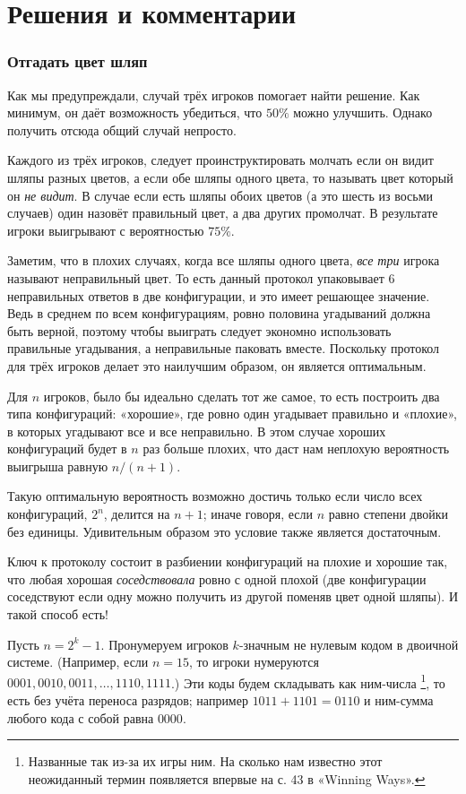 \section*{Решения и комментарии}

\subsubsection*{Отгадать цвет шляп}

Как мы предупреждали, случай трёх игроков помогает найти решение.
Как минимум, он даёт возможность убедиться, что $50\%$ можно улучшить.
Однако получить отсюда общий случай непросто.

Каждого из трёх игроков, следует проинструктировать молчать если он видит шляпы разных цветов,
а если обе шляпы одного цвета, то называть цвет который он \emph{не видит}.
В случае если есть шляпы обоих цветов (а это шесть из восьми случаев) один назовёт правильный цвет, а два других промолчат.
В результате игроки выигрывают с вероятностью $75\%$.

Заметим, что в плохих случаях, когда все шляпы одного цвета, \emph{все три} игрока называют неправильный цвет.
То есть данный протокол упаковывает 6 неправильных ответов в две конфигурации, и это имеет решающее значение.
Ведь в среднем по всем конфигурациям, ровно половина угадываний должна быть верной, поэтому чтобы выиграть следует экономно использовать правильные угадывания, а неправильные паковать вместе.
Поскольку протокол для трёх игроков делает это наилучшим образом, он является оптимальным.

Для $n$ игроков, было бы идеально сделать тот же самое,
то есть построить два типа конфигураций: «хорошие», где ровно один угадывает правильно и «плохие», в которых угадывают все и все неправильно.
В этом случае хороших конфигураций будет в $n$ раз больше плохих,
что даст нам неплохую вероятность выигрыша равную $n/(n+1)$.

Такую оптимальную вероятность возможно достичь только если число всех конфигураций, $2^n$, делится на $n+1$;
иначе говоря, если $n$ равно степени двойки без единицы.
Удивительным образом это условие также является достаточным.

Ключ к протоколу состоит в разбиении конфигураций на плохие и хорошие так, что любая хорошая \emph{соседствовала} ровно с одной плохой (две конфигурации соседствуют если одну можно получить из другой поменяв цвет одной шляпы).
И такой способ есть!

Пусть $n=2^k-1$.
Пронумеруем игроков $k$-значным не нулевым кодом в двоичной системе.
(Например, если $n=15$, то игроки нумеруются $0001,0010,0011,\dots,1110,1111$.)
Эти коды будем складывать как ним-числа%
\footnote{Названные так из-за их игры ним. На сколько нам известно этот неожиданный термин появляется впервые на с. 43 в «Winning Ways».}, то есть без учёта переноса разрядов;
например $1011 + 1101 =0110$ и ним-сумма любого кода с собой равна $0000$.

